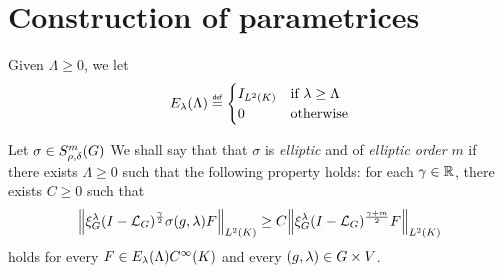 \section{Construction of parametrices}

Given $\Lambda \geq 0$,
we let
\begin{align*}
    E_\lambda(\Lambda)
    \defeq
    \begin{cases}
        \Id {\Lebesgue 2 \CompactGroup} & \text{if } \lambda \geq \Lambda\\
        0 & \text{otherwise}
    \end{cases}
\end{align*}

\begin{definition}[Ellipticity]
\label{definition:ellipticity}
    Let $\sigma \in S^{m}_{\rho, \delta}(G)$
    We shall say that that $\sigma$ is \emph{elliptic} and of \emph{elliptic order} $m$
    if there exists $\Lambda \geq 0$ such that the following property holds:
    for each $\gamma \in \mathbb{R}$,
    there exists $C \geq 0$ such that
    \begin{align}
        \norm [\Lebesgue 2 \CompactGroup] {\Rep \lambda \BesselPotential \gamma \sigma(g, \lambda) F}
        \geq C
        \norm [\Lebesgue 2 \CompactGroup] {\Rep \lambda \BesselPotential {\gamma + m} F}
        \label{eq:definition_of_ellipticity}
    \end{align}
    holds for every $F \in E_\lambda(\Lambda) {C^\infty(K)}$
    and every $(g, \lambda) \in G \times V$.
\end{definition}

